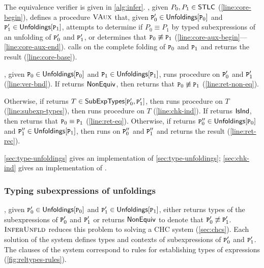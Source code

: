 The equivalence verifier \verify is given in \autoref{alg:infer}.
%
\verify, given $P_0, P_1 \in \mathsf{STLC}$ (\autoref{line:core-begin}),
defines a procedure $\textsc{VAux}$ that, given $\cc{P}_0' \in
\unfoldings{ \cc{P}_0 }$ and $\cc{P}_1' \in \unfoldings{ \cc{P}_1 }$,
attempts to determine if $P_0 \equiv P_1$ by typed subexpressions of
an unfolding 
%
%
of $\cc{P}_0'$ and $\cc{P}_1'$, or determines that $\cc{P}_0
\not\equiv \cc{P}_1$
(\autoref{line:core-aux-begin}---\autoref{line:core-aux-end}).
%
\verify calls \verifyaux on the complete folding of $\cc{P}_0$ and
$\cc{P}_1$ and returns the result (\autoref{line:core-base}).

\verifyaux, given $\cc{P}_0 \in \unfoldings{\cc{P}_0}$ and $\cc{P}_1
\in \unfoldings{ \cc{P}_1 }$, runs procedure \verifybnd on $\cc{P}_0'$
and $\cc{P}_1'$ (\autoref{line:ver-bnd}).
%
If \verifybnd returns $\mathsf{NonEquiv}$, then \verify returns that $\cc{P}_0
\not\equiv \cc{P}_1$ (\autoref{line:ret-non-eq}).

%
Otherwise, if \verifybnd returns $T \in \subexptypes{ \cc{P}_0' }{
  \cc{P}_1' }$,
%
%
then \verify runs procedure \verifyaux on $T$
(\autoref{line:subexp-types}), then \verifybnd runs procedure
\chkinductive on $T$ (\autoref{line:chk-ind}).
%
If \chkinductive returns $\mathsf{IsInd}$, then \verify returns that $\cc{P}_0
\equiv \cc{P}_1$ (\autoref{line:ret-eq}).
Otherwise, if \chkinductive returns $\cc{P}_0'' \in \unfoldings{
  \cc{P}_0 }$ and $\cc{P}_1'' \in \unfoldings{ \cc{P}_1 }$, then
\verifyaux runs \verifyaux on $\cc{P}_0''$ and $\cc{P}_1''$ and
returns the result (\autoref{line:ret-rec}).

\autoref{sec:type-unfoldings} gives an implementation of
\autoref{sec:type-unfoldings};
%
\autoref{sec:chk-ind} gives an implementation of \chkinductive.

\subsubsection{Typing subexpressions of unfoldings}
\label{sec:type-unfoldings}
\verifybnd, given $\cc{P}_0' \in \unfoldings{ \cc{P}_0 }$ and
$\cc{P}_1' \in \unfoldings{ \cc{P}_1 }$, either returns types of the
subexpressions of $\cc{P}_0'$ and $\cc{P}_1'$ or returns $\mathsf{NonEquiv}$
to denote that $\cc{P}_0' \not\equiv \cc{P}_1'$.
%
$\textsc{InferUnfld}$ reduces this problem to solving a CHC system
(\autoref{sec:chcs}).
%
Each solution of the system defines types and contexts of
subexpressions of $\cc{P}_0'$ and $\cc{P}_1'$.
%
The clauses of the system correspond to rules for establishing types
of expressions (\autoref{fig:reltypes-rules}).

